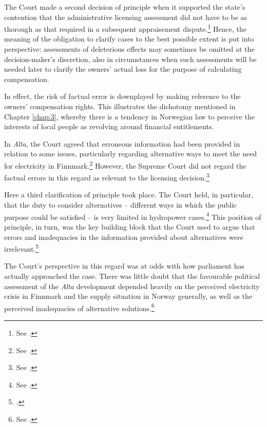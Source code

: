 The Court made a second decision of principle when it supported the state's contention that the administrative licensing assessment did not have to be as thorough as that required in a subsequent appraisement dispute.\footnote{See \cite[279|330]{alta82}.} Hence, the meaning of the obligation to clarify cases to the best possible extent is put into perspective: assessments of deleterious effects may sometimes be omitted at the decision-maker's discretion, also in circumstances when such assessments will be needed later to clarify the owners' actual loss for the purpose of calculating compensation.


In effect, the risk of factual error is downplayed by making reference to the owners' compensation rights.%
This illustrates the dichotomy mentioned in Chapter \ref{chap:3}, whereby there is a tendency in Norwegian law to perceive the interests of local people as revolving around financial entitlements.

In {\it Alta}, the Court agreed that erroneous information had been provided in relation to some issues, particularly regarding alternative ways to meet the need for electricity in Finnmark.\footnote{See \cite[346-357]{alta82}.} However, the Supreme Court did not regard the factual errors in this regard as relevant to the licensing decision.\footnote{See \cite[346]{alta82}.}

Here a third clarification of principle took place. The Court held, in particular, that the duty to consider alternatives -- different ways in which the public purpose could be satisfied -- is very limited in hydropower cases.\footnote{See \cite[346]{alta82}.} This position of principle, in turn, was the key building block that the Court used to argue that errors and inadequacies in the information provided about alternatives were irrelevant.\footcite[346]{alta82} 

The Court's perspective in this regard was at odds with how parliament has actually approached the case. There was little doubt that the favourable political assessment of the {\it Alta} development depended heavily on the perceived electricity crisis in Finnmark and the supply situation in Norway generally, as well as the perceived inadequacies of alternative solutions.\footnote{See \cite[338-347]{alta82}.}

